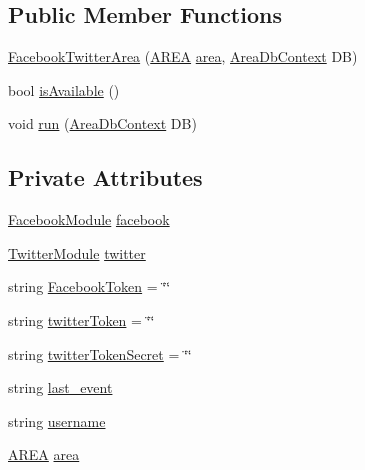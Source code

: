 \subsection*{Public Member Functions}
\begin{DoxyCompactItemize}
\item 
\mbox{\hyperlink{classArea_1_1Models_1_1FacebookTwitterArea_a0dc27d5ece84c475eef593c6fa5bbf37}{Facebook\+Twitter\+Area}} (\mbox{\hyperlink{classArea_1_1Models_1_1AREA}{A\+R\+EA}} \mbox{\hyperlink{classArea_1_1Models_1_1FacebookTwitterArea_a6a3c4f7dbf8cf22fb47b567d0a0742bb}{area}}, \mbox{\hyperlink{classArea_1_1DAT_1_1AreaDbContext}{Area\+Db\+Context}} DB)
\item 
bool \mbox{\hyperlink{classArea_1_1Models_1_1FacebookTwitterArea_a654f1444c68fdbeb379c6df404b5b9f9}{is\+Available}} ()
\item 
void \mbox{\hyperlink{classArea_1_1Models_1_1FacebookTwitterArea_a6fd52c3124301206f73b8c9f025872d4}{run}} (\mbox{\hyperlink{classArea_1_1DAT_1_1AreaDbContext}{Area\+Db\+Context}} DB)
\end{DoxyCompactItemize}
\subsection*{Private Attributes}
\begin{DoxyCompactItemize}
\item 
\mbox{\hyperlink{classArea_1_1Models_1_1FacebookModule}{Facebook\+Module}} \mbox{\hyperlink{classArea_1_1Models_1_1FacebookTwitterArea_a7bfebac946d10f29dac8fc33449427af}{facebook}}
\item 
\mbox{\hyperlink{classArea_1_1Models_1_1TwitterModule}{Twitter\+Module}} \mbox{\hyperlink{classArea_1_1Models_1_1FacebookTwitterArea_acebc9b536cdd6cfa6cb99ea1a9f89b90}{twitter}}
\item 
string \mbox{\hyperlink{classArea_1_1Models_1_1FacebookTwitterArea_a701c427f5c067899221039ba7db5f5f6}{Facebook\+Token}} = \char`\"{}\char`\"{}
\item 
string \mbox{\hyperlink{classArea_1_1Models_1_1FacebookTwitterArea_ae05b7948cc24abc795d876b19f8aba89}{twitter\+Token}} = \char`\"{}\char`\"{}
\item 
string \mbox{\hyperlink{classArea_1_1Models_1_1FacebookTwitterArea_a79452d304aad4671b49c7d8045c75473}{twitter\+Token\+Secret}} = \char`\"{}\char`\"{}
\item 
string \mbox{\hyperlink{classArea_1_1Models_1_1FacebookTwitterArea_abf989aac27915851f2123dfa2fc39174}{last\+\_\+event}}
\item 
string \mbox{\hyperlink{classArea_1_1Models_1_1FacebookTwitterArea_ab361e159ba9a67bdd3f12fa0dac4b3a1}{username}}
\item 
\mbox{\hyperlink{classArea_1_1Models_1_1AREA}{A\+R\+EA}} \mbox{\hyperlink{classArea_1_1Models_1_1FacebookTwitterArea_a6a3c4f7dbf8cf22fb47b567d0a0742bb}{area}}
\end{DoxyCompactItemize}


